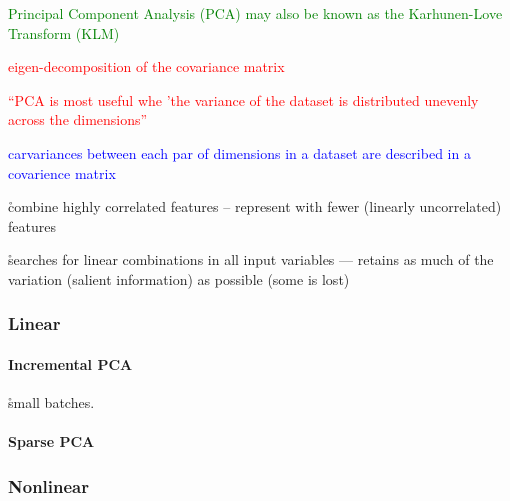\textcolor{green}{{Principal Component Analysis (PCA)} may also be known as the {Karhunen-Love Transform (KLM)} }

\textcolor{red}{eigen-decomposition of the covariance matrix}

\textcolor{red}{``PCA is most useful whe 'the variance of the dataset is distributed unevenly across the dimensions'' }

\textcolor{blue}{carvariances between each par of dimensions in a dataset are described in a {covarience matrix} }

\r{combine highly correlated features -- represent with fewer (linearly uncorrelated) features}

\r{searches for linear combinations in all input variables --- retains as much of the variation (salient information) as possible (some is lost)}



\subsubsection{Linear}

\paragraph{Incremental PCA}

\r{small batches.}

\paragraph{Sparse PCA}



\subsubsection{Nonlinear}

